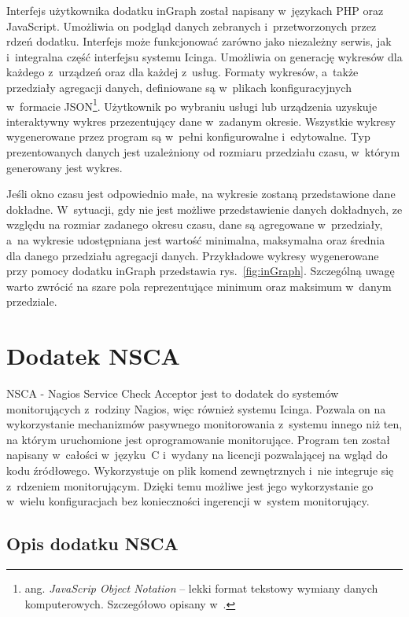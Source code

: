 Interfejs użytkownika dodatku inGraph został napisany w~językach PHP
oraz JavaScript. Umożliwia on podgląd danych zebranych
i~przetworzonych przez rdzeń dodatku. Interfejs może funkcjonować
zarówno jako niezależny serwis, jak i~integralna część interfejsu
systemu Icinga. Umożliwia on generację wykresów dla każdego z~urządzeń
oraz dla każdej z~usług. Formaty wykresów, a~także przedziały
agregacji danych, definiowane są w~plikach konfiguracyjnych w~formacie
JSON\footnote{ang. {\em JavaScrip Object Notation} -- lekki format
  tekstowy wymiany danych komputerowych. Szczegółowo opisany
  w~\cite{www:JSON}.}. Użytkownik po wybraniu usługi lub urządzenia
uzyskuje interaktywny wykres przezentujący dane w~zadanym
okresie. Wszystkie wykresy wygenerowane przez program są w~pełni
konfigurowalne i~edytowalne. Typ prezentowanych danych jest
uzależniony od rozmiaru przedziału czasu, w~którym generowany jest
wykres.

Jeśli okno czasu jest odpowiednio małe, na wykresie zostaną
przedstawione dane dokładne. W~sytuacji, gdy nie jest możliwe
przedstawienie danych dokładnych, ze względu na rozmiar zadanego
okresu czasu, dane są agregowane w~przedziały, a~na wykresie
udostępniana jest wartość minimalna, maksymalna oraz średnia dla
danego przedziału agregacji danych. Przykładowe wykresy wygenerowane
przy pomocy dodatku inGraph przedstawia
rys.~\ref{fig:inGraph}. Szczególną uwagę warto zwrócić na szare pola
reprezentujące minimum oraz maksimum w~danym przedziale.


\section[Dodatek NSCA][Dodatek NSCA]{Dodatek NSCA}
\label{sec:NSCA}

NSCA - Nagios Service Check Acceptor jest to dodatek do systemów
monitorujących z~rodziny Nagios, więc również systemu Icinga. Pozwala
on na wykorzystanie mechanizmów pasywnego monitorowania z~systemu
innego niż ten, na którym uruchomione jest oprogramowanie
monitorujące. Program ten został napisany w~całości w~języku~C
i~wydany na licencji pozwalającej na wgląd do kodu
źródłowego. Wykorzystuje on plik komend zewnętrznych i~nie integruje
się z~rdzeniem monitorującym. Dzięki temu możliwe jest jego
wykorzystanie go w~wielu konfiguracjach bez konieczności ingerencji
w~system monitorujący.

\subsection[Opis dodatku NSCA][Opis dodatku NSCA]{Opis dodatku NSCA}

